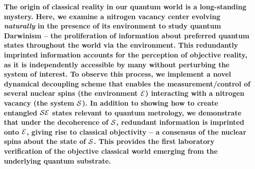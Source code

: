 \documentclass[aps,prl,floatfix,twocolumn,footinbib,superscriptaddress]{revtex4-1}
\begin{document}
\author{M. Zwolak}

\author{W. H. Zurek}

\author{F. Jelezko}

\maketitle

{\bf 
The origin of classical reality in our quantum world is a long-standing mystery. Here, we examine a nitrogen vacancy center evolving {\em naturally} in the presence of its environment to study quantum Darwinism -- the proliferation of information about preferred quantum states throughout the world via the environment. This redundantly imprinted information accounts for the perception of objective reality, as it is independently accessible by many without perturbing the system of interest. To observe this process, we implement a novel dynamical decoupling scheme that enables the measurement/control of several nuclear spins (the environment $\E$) interacting with a nitrogen vacancy (the system $\S$). In addition to showing how to create entangled $\S\E$ states relevant to quantum metrology, we demonstrate that under the decoherence of $\S$, redundant information is imprinted onto $\E$, giving rise to classical objectivity -- a consensus of the nuclear spins about the state of $\S$. This provides the first laboratory verification of the objective classical world emerging from the underlying quantum substrate.
}
\end{document}

